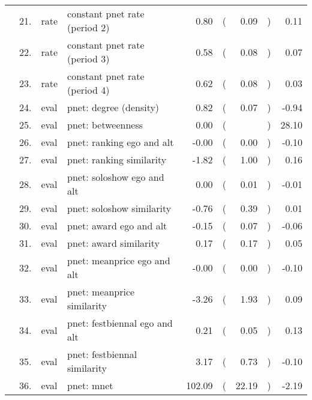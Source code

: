 \begin{table}[ht]
\begin{tabular}{llllrlrlr}
    & 21. & rate & constant pnet rate (period 2) & 0.80 & ( & 0.09 & ) & 0.11 \\ 
    & 22. & rate & constant pnet rate (period 3) & 0.58 & ( & 0.08 & ) & 0.07 \\ 
    & 23. & rate & constant pnet rate (period 4) & 0.62 & ( & 0.08 & ) & 0.03 \\ 
    & 24. & eval & pnet: degree (density) & 0.82 & ( & 0.07 & ) & -0.94 \\ 
    & 25. & eval & pnet: betweenness & 0.00 & ( &  & ) & 28.10 \\ 
    & 26. & eval & pnet: ranking ego and alt & -0.00 & ( & 0.00 & ) & -0.10 \\ 
    & 27. & eval & pnet: ranking similarity & -1.82 & ( & 1.00 & ) & 0.16 \\ 
    & 28. & eval & pnet: soloshow ego and alt & 0.00 & ( & 0.01 & ) & -0.01 \\ 
    & 29. & eval & pnet: soloshow similarity & -0.76 & ( & 0.39 & ) & 0.01 \\ 
    & 30. & eval & pnet: award ego and alt & -0.15 & ( & 0.07 & ) & -0.06 \\ 
    & 31. & eval & pnet: award similarity & 0.17 & ( & 0.17 & ) & 0.05 \\ 
    & 32. & eval & pnet: meanprice ego and alt & -0.00 & ( & 0.00 & ) & -0.10 \\ 
    & 33. & eval & pnet: meanprice similarity & -3.26 & ( & 1.93 & ) & 0.09 \\ 
    & 34. & eval & pnet: festbiennal ego and alt & 0.21 & ( & 0.05 & ) & 0.13 \\ 
    & 35. & eval & pnet: festbiennal similarity & 3.17 & ( & 0.73 & ) & -0.10 \\ 
    & 36. & eval & pnet: mnet & 102.09 & ( & 22.19 & ) & -2.19 \\ 
   \hline
\end{tabular}
\end{table}
